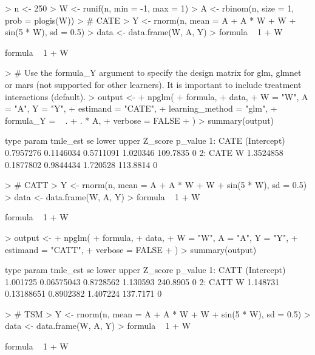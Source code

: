 \documentclass{article}
\begin{document}
\begin{Schunk}
\begin{Sinput}
> n <- 250
> W <- runif(n, min = -1, max = 1)
> A <- rbinom(n, size = 1, prob = plogis(W))
> # CATE
> Y <- rnorm(n, mean = A + A * W + W + sin(5 * W), sd = 0.5)
> data <- data.frame(W, A, Y)
> formula ~ 1 + W
\end{Sinput}
\begin{Soutput}
formula ~ 1 + W
\end{Soutput}
\begin{Sinput}
> # Use the formula_Y argument to specify the design matrix for glm, glmnet or mars (not supported for other learners). It is important to include treatment interactions (default).
> output <-
+   npglm(
+     formula,
+     data,
+     W = "W", A = "A", Y = "Y",
+     estimand = "CATE",
+     learning_method = "glm",
+     formula_Y = ~ . + . * A,
+     verbose = FALSE
+   )
> summary(output)
\end{Sinput}
\begin{Soutput}
   type       param  tmle_est        se     lower    upper  Z_score p_value
1: CATE (Intercept) 0.7957276 0.1146034 0.5711091 1.020346 109.7835       0
2: CATE           W 1.3524858 0.1877802 0.9844434 1.720528 113.8814       0
\end{Soutput}
\begin{Sinput}
> # CATT
> Y <- rnorm(n, mean = A + A * W + W + sin(5 * W), sd = 0.5)
> data <- data.frame(W, A, Y)
> formula ~ 1 + W
\end{Sinput}
\begin{Soutput}
formula ~ 1 + W
\end{Soutput}
\begin{Sinput}
> output <-
+   npglm(
+     formula,
+     data,
+     W = "W", A = "A", Y = "Y",
+     estimand = "CATT",
+     verbose = FALSE
+   )
> summary(output)
\end{Sinput}
\begin{Soutput}
   type       param tmle_est         se     lower    upper  Z_score p_value
1: CATT (Intercept) 1.001725 0.06575043 0.8728562 1.130593 240.8905       0
2: CATT           W 1.148731 0.13188651 0.8902382 1.407224 137.7171       0
\end{Soutput}
\begin{Sinput}
> # TSM
> Y <- rnorm(n, mean = A + A * W + W + sin(5 * W), sd = 0.5)
> data <- data.frame(W, A, Y)
> formula ~ 1 + W
\end{Sinput}
\begin{Soutput}
formula ~ 1 + W
\end{Soutput}

\end{Schunk}
\end{document}
